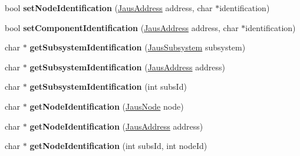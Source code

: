\begin{DoxyCompactItemize}
\item 
\hypertarget{class_system_tree_a12a318ceeafc47e6cd906f2e5ce8cbe4}{bool {\bfseries set\-Node\-Identification} (\hyperlink{struct_jaus_address_struct}{\-Jaus\-Address} address, char $\ast$identification)}\label{class_system_tree_a12a318ceeafc47e6cd906f2e5ce8cbe4}

\item 
\hypertarget{class_system_tree_a83dd9e915cc00cfb4c081a49eaa6355c}{bool {\bfseries set\-Component\-Identification} (\hyperlink{struct_jaus_address_struct}{\-Jaus\-Address} address, char $\ast$identification)}\label{class_system_tree_a83dd9e915cc00cfb4c081a49eaa6355c}

\item 
\hypertarget{class_system_tree_a5fe50bd22a9ff0fdf03cd82fd4734282}{char $\ast$ {\bfseries get\-Subsystem\-Identification} (\hyperlink{struct_jaus_subsystem_struct}{\-Jaus\-Subsystem} subsystem)}\label{class_system_tree_a5fe50bd22a9ff0fdf03cd82fd4734282}

\item 
\hypertarget{class_system_tree_a946af12547c6578b42384af30e6e31cd}{char $\ast$ {\bfseries get\-Subsystem\-Identification} (\hyperlink{struct_jaus_address_struct}{\-Jaus\-Address} address)}\label{class_system_tree_a946af12547c6578b42384af30e6e31cd}

\item 
\hypertarget{class_system_tree_a4192e4b2bac1a5bca6435a78c37f4c6d}{char $\ast$ {\bfseries get\-Subsystem\-Identification} (int subs\-Id)}\label{class_system_tree_a4192e4b2bac1a5bca6435a78c37f4c6d}

\item 
\hypertarget{class_system_tree_ad97831229f0f863e5988b99543dbcc18}{char $\ast$ {\bfseries get\-Node\-Identification} (\hyperlink{struct_jaus_node_struct}{\-Jaus\-Node} node)}\label{class_system_tree_ad97831229f0f863e5988b99543dbcc18}

\item 
\hypertarget{class_system_tree_a1aeecbe87a8ca2376ed2c592334e397a}{char $\ast$ {\bfseries get\-Node\-Identification} (\hyperlink{struct_jaus_address_struct}{\-Jaus\-Address} address)}\label{class_system_tree_a1aeecbe87a8ca2376ed2c592334e397a}

\item 
\hypertarget{class_system_tree_a4da6fe0352f4c79797f73532807ee595}{char $\ast$ {\bfseries get\-Node\-Identification} (int subs\-Id, int node\-Id)}\label{class_system_tree_a4da6fe0352f4c79797f73532807ee595}


\end{DoxyCompactItemize}
